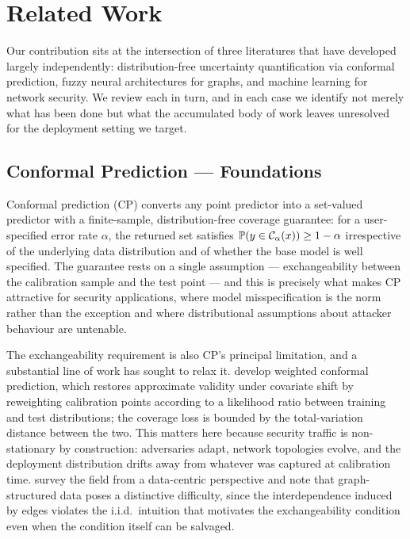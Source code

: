 \section{Related Work}
\label{sec:related}

Our contribution sits at the intersection of three literatures that have
developed largely independently: distribution-free uncertainty quantification
via conformal prediction, fuzzy neural architectures for graphs, and machine
learning for network security. We review each in turn, and in each case we
identify not merely what has been done but what the accumulated body of work
leaves unresolved for the deployment setting we target.

\subsection{Conformal Prediction — Foundations}

Conformal prediction (CP) \citep{angelopoulos21} converts any point predictor
into a set-valued predictor with a finite-sample, distribution-free coverage
guarantee: for a user-specified error rate $\alpha$, the returned set satisfies
$\mathbb{P}(y \in \mathcal{C}_\alpha(x)) \ge 1-\alpha$ irrespective of the underlying data
distribution and of whether the base model is well specified. The guarantee
rests on a single assumption — exchangeability between the calibration sample
and the test point — and this is precisely what makes CP attractive for
security applications, where model misspecification is the norm rather than the
exception and where distributional assumptions about attacker behaviour are
untenable.

The exchangeability requirement is also CP's principal limitation, and a
substantial line of work has sought to relax it. \citet{barber23} develop
weighted conformal prediction, which restores approximate validity under
covariate shift by reweighting calibration points according to a likelihood
ratio between training and test distributions; the coverage loss is bounded by
the total-variation distance between the two. This matters here because
security traffic is non-stationary by construction: adversaries adapt, network
topologies evolve, and the deployment distribution drifts away from whatever
was captured at calibration time. \citet{cp_survey} survey the field from a
data-centric perspective and note that graph-structured data poses a distinctive
difficulty, since the interdependence induced by edges violates the i.i.d.\
intuition that motivates the exchangeability condition even when the condition
itself can be salvaged.

